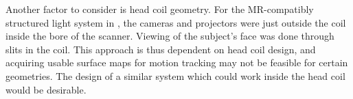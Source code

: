 \documentclass[class=article, crop=false]{standalone}
\begin{document}
\par
Another factor to consider is head coil geometry. For the MR-compatibly structured light system in \cite{Olesen2015a}, the cameras and projectors were just outside the coil inside the bore of the scanner. Viewing of the subject's face was done through slits in the coil. This approach is thus dependent on head coil design, and acquiring usable surface maps for motion tracking may not be feasible for certain geometries. The design of a similar system which could work inside the head coil would be desirable.
\end{document}
